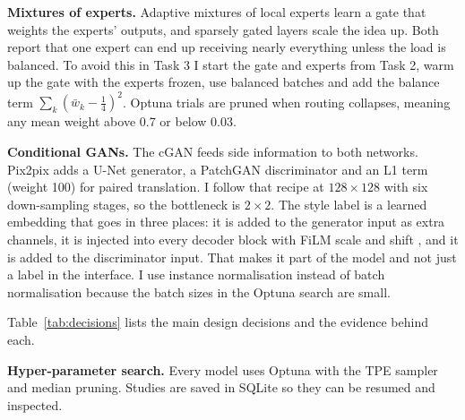 \documentclass[conference]{IEEEtran}
\begin{document}
\textbf{Mixtures of experts.} Adaptive mixtures of local experts \cite{jacobs1991} learn a gate that weights the experts' outputs, and sparsely gated layers \cite{shazeer2017} scale the idea up. Both report that one expert can end up receiving nearly everything unless the load is balanced. To avoid this in Task 3 I start the gate and experts from Task 2, warm up the gate with the experts frozen, use balanced batches and add the balance term $\sum_k(\bar w_k-\frac14)^2$. Optuna trials are pruned when routing collapses, meaning any mean weight above 0.7 or below 0.03.

\textbf{Conditional GANs.} The cGAN \cite{mirza2014} feeds side information to both networks. Pix2pix \cite{isola2017} adds a U-Net \cite{ronneberger2015} generator, a PatchGAN discriminator and an L1 term (weight 100) for paired translation. I follow that recipe at $128\times128$ with six down-sampling stages, so the bottleneck is $2\times2$. The style label is a learned embedding that goes in three places: it is added to the generator input as extra channels, it is injected into every decoder block with FiLM scale and shift \cite{perez2018film}, and it is added to the discriminator input. That makes it part of the model and not just a label in the interface. I use instance normalisation \cite{ulyanov2016} instead of batch normalisation because the batch sizes in the Optuna search are small.

Table~\ref{tab:decisions} lists the main design decisions and the evidence behind each.

\textbf{Hyper-parameter search.} Every model uses Optuna \cite{akiba2019} with the TPE sampler and median pruning. Studies are saved in SQLite so they can be resumed and inspected.
\end{document}
